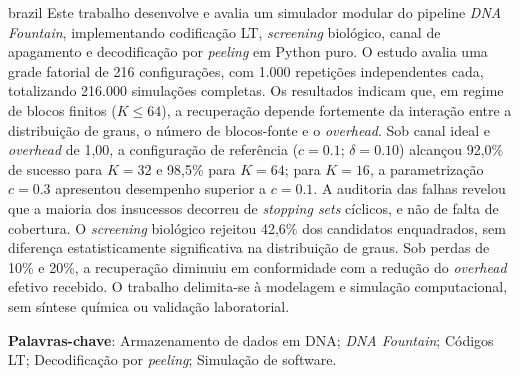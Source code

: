 \begin{resumo}[Resumo]
\begin{otherlanguage*}{brazil}
Este trabalho desenvolve e avalia um simulador modular do pipeline \emph{DNA Fountain}, implementando codificação LT, \emph{screening} biológico, canal de apagamento e decodificação por \emph{peeling} em Python puro. O estudo avalia uma grade fatorial de 216 configurações, com 1.000 repetições independentes cada, totalizando 216.000 simulações completas. Os resultados indicam que, em regime de blocos finitos ($K \leq 64$), a recuperação depende fortemente da interação entre a distribuição de graus, o número de blocos-fonte e o \emph{overhead}. Sob canal ideal e \emph{overhead} de 1,00, a configuração de referência ($c=0.1$; $\delta=0.10$) alcançou 92,0\% de sucesso para $K=32$ e 98,5\% para $K=64$; para $K=16$, a parametrização $c=0.3$ apresentou desempenho superior a $c=0.1$. A auditoria das falhas revelou que a maioria dos insucessos decorreu de \emph{stopping sets} cíclicos, e não de falta de cobertura. O \emph{screening} biológico rejeitou 42,6\% dos candidatos enquadrados, sem diferença estatisticamente significativa na distribuição de graus. Sob perdas de 10\% e 20\%, a recuperação diminuiu em conformidade com a redução do \emph{overhead} efetivo recebido. O trabalho delimita-se à modelagem e simulação computacional, sem síntese química ou validação laboratorial.

\vspace{\onelineskip}

\noindent
\textbf{Palavras-chave}: Armazenamento de dados em DNA; \emph{DNA Fountain}; Códigos LT; Decodificação por \emph{peeling}; Simulação de software.
\end{otherlanguage*}
\end{resumo}